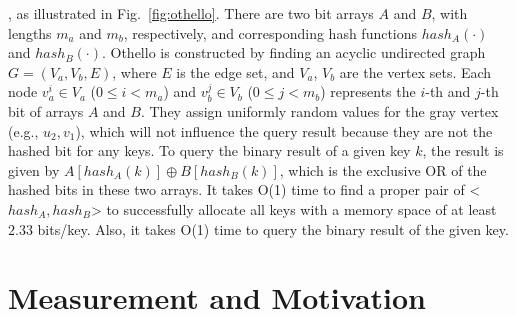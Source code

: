 , as illustrated in Fig.~\ref{fig:othello}. There are two bit arrays $A$ and $B$, with lengths $m_a$ and $m_b$, respectively, and corresponding hash functions $hash_A(\cdot)$ and $hash_B(\cdot)$. 
Othello is constructed by finding an acyclic undirected graph $G=(V_a,V_b,E)$, where $E$ is the edge set, and $V_a$, $V_b$ are the vertex sets. Each node $v^i_a \in V_a$ ($0 \leq i < m_a$) and $v^j_b \in V_b$ ($0 \leq j < m_b$) represents the $i$-th and $j$-th bit of arrays $A$ and $B$.
They assign uniformly random values for the gray vertex (e.g., $u_2, v_1$), which will not influence the query result because they are not the hashed bit for any keys.
To query the binary result of a given key $k$, the result is given by $A[hash_A(k)] \oplus B[hash_B(k)]$, which is the exclusive OR of the hashed bits in these two arrays. 
It takes O(1) time to find a proper pair of <$hash_A, hash_B$> to successfully allocate all keys with a memory space of at least $2.33$ bits/key. Also, it takes O(1) time to query the binary result of the given key.
\fi


\vspace{-2.5ex}
\section{Measurement and Motivation}
\label{sec:motivation}
\vspace{-.5ex}

